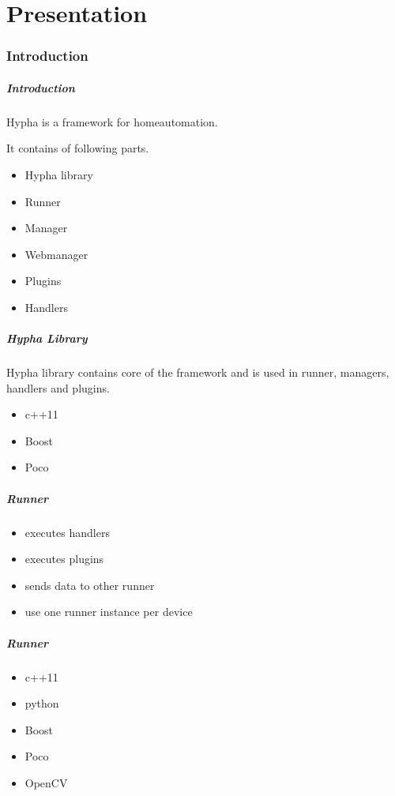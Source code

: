 \part[Presentation]{Presentation}
\section{Introduction}

\begin{frame}
	\frametitle{Introduction}
	Hypha is a framework for homeautomation.
	
	It contains of following parts.
	\begin{itemize} 
		\item Hypha library
		\item Runner
		\item Manager
		\item Webmanager
		\item Plugins
		\item Handlers
	\end{itemize}
\end{frame}

\begin{frame}
	\frametitle{Hypha Library}
	Hypha library contains core of the framework and is used in runner, managers, handlers and plugins.
	\begin{itemize}
		\item c++11
		\item Boost
		\item Poco
	\end{itemize}
\end{frame}

\begin{frame}
	\frametitle{Runner}
	\begin{itemize}
		\item executes handlers
		\item executes plugins
		\item sends data to other runner
		\item use one runner instance per device
	\end{itemize}
\end{frame}

\begin{frame}
	\frametitle{Runner}
	\begin{itemize}
		\item c++11
		\item python
		\item Boost
		\item Poco
		\item OpenCV
	\end{itemize}
\end{frame}

